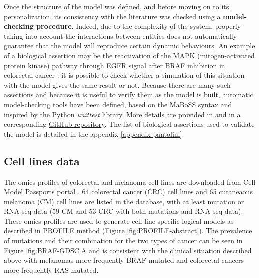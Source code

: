 \documentclass[a4paper,12pt,twoside,onecolumn,openright,final,oldfontcommands]{memoir}
\begin{document}
Once the structure of the model was defined, and before moving on to its
personalization, its consistency with the literature was checked using a
\textbf{model-checking procedure}. Indeed, due to the complexity of the
system, properly taking into account the interactions between entities
does not automatically guarantee that the model will reproduce certain
dynamic behaviours. An example of a biological assertion may be the
reactivation of the MAPK (mitogen-activated protein kinase) pathway
through EGFR signal after BRAF inhibition in colorectal cancer
\citep{prahallad2012unresponsiveness}: it is possible to check whether a
simulation of this situation with the model gives the same result or
not. Because there are many such assertions and because it is useful to
verify them as the model is built, automatic model-checking tools have
been defined, based on the MaBoSS syntax and inspired by the Python
\emph{unittest} library. More details are provided in
\citet{beal2020personalized} and in a corresponding
\href{https://github.com/sysbio-curie/MaBoSS_test}{GitHub repository}.
The list of biological assertions used to validate the model is detailed
in the appendix \ref{appendix-pantolini}.

\subsection{Cell lines data}\label{cell-lines-data}

The omics profiles of colorectal and melanoma cell lines are downloaded
from Cell Model Passports portal \citep{van2019cell}. 64 colorectal
cancer (CRC) cell lines and 65 cutaneaous melanoma (CM) cell lines are
listed in the database, with at least mutation or RNA-seq data (59 CM
and 53 CRC with both mutations and RNA-seq data). These omics profiles
are used to generate cell-line-specific logical models as described in
PROFILE method (Figure \ref{fig:PROFILE-abstract}). The prevalence of
mutations and their combination for the two types of cancer can be seen
in Figure \ref{fig:BRAF-GDSC}A and is consistent with the clinical
situation described above with melanomas more frequently BRAF-mutated
and colorectal cancers more frequently RAS-mutated.
\end{document}
